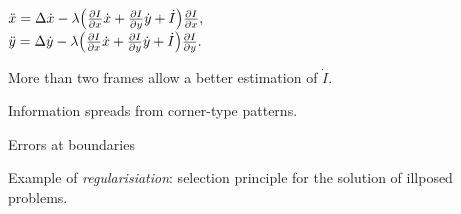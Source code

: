 \begin{compactdesc}
\begin{enumerate*}[label=\protect\circled{\arabic*},itemjoin=]
				$\ddot{x}=\Delta \dot{x}-\lambda\!\left( \frac{\partial I}{\partial x}\dot{x}+\frac{\partial I}{\partial y}\dot{y}+\dot{I} \right)\!\frac{\partial I}{\partial x},\\$\\
				$\ddot{y}=\Delta \dot{y}-\lambda\!\left( \frac{\partial I}{\partial x}\dot{x}+\frac{\partial I}{\partial y}\dot{y}+\dot{I} \right)\!\frac{\partial I}{\partial y}.$\\
		\item More than two frames allow a better estimation of $\dot{I}$.\\
			\item Information spreads from corner-type patterns.\\
			\item Errors at boundaries\\
			\item Example of \emph{regularisiation}: selection principle for the solution of illposed problems.\\
		\end{enumerate*}

\end{compactdesc}
